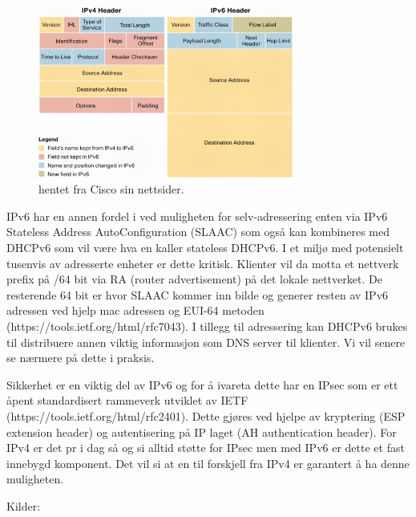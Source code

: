 \documentclass{article}
\begin{document}
\begin{figure}[!ht]
  \centering
      \includegraphics[width=0.75\textwidth]{CiscoHeader}
  \caption {hentet fra Cisco sin nettsider.}
\end{figure}

IPv6 har en annen fordel i ved muligheten for selv-adressering enten via IPv6 Stateless Address AutoConfiguration (SLAAC) som også kan kombineres med DHCPv6 som vil være hva en kaller stateless DHCPv6. I et miljø med potensielt tusenvis av adresserte enheter er dette kritisk. Klienter vil da motta et nettverk prefix på /64 bit via RA (router advertisement) på det lokale nettverket. De resterende 64 bit er hvor SLAAC kommer inn bilde og generer resten av IPv6 adressen ved hjelp mac adressen og EUI-64 metoden (https://tools.ietf.org/html/rfc7043). I tillegg til adressering kan DHCPv6 brukes til distribuere annen viktig informasjon som DNS server til klienter. Vi vil senere se nærmere på dette i praksis. 

Sikkerhet er en viktig del av IPv6 og for å ivareta dette har en IPsec som er ett åpent standardisert rammeverk utviklet av IETF (https://tools.ietf.org/html/rfc2401). Dette gjøres ved hjelpe av kryptering (ESP extension header)  og autentisering på IP laget (AH authentication header). For IPv4 er det pr i dag så og si alltid støtte for IPsec men med IPv6 er dette et fast innebygd komponent. Det vil si at en til forskjell fra IPv4 er garantert å ha denne muligheten. 

Kilder:
\end{document}
